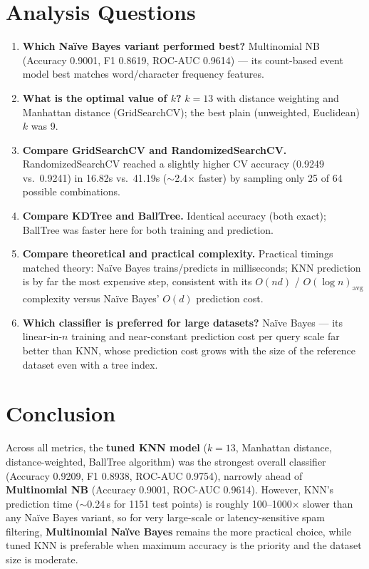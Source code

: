 \documentclass[11pt]{article}
\begin{document}
\section{Analysis Questions}
\begin{enumerate}
    \item \textbf{Which Na\"ive Bayes variant performed best?} Multinomial NB
    (Accuracy 0.9001, F1 0.8619, ROC-AUC 0.9614) — its count-based event model best
    matches word/character frequency features.
    \item \textbf{What is the optimal value of $k$?} $k=13$ with distance weighting and
    Manhattan distance (GridSearchCV); the best plain (unweighted, Euclidean) $k$ was 9.
    \item \textbf{Compare GridSearchCV and RandomizedSearchCV.} RandomizedSearchCV
    reached a slightly higher CV accuracy (0.9249 vs.\ 0.9241) in 16.82s vs.\ 41.19s
    ($\sim$2.4$\times$ faster) by sampling only 25 of 64 possible combinations.
    \item \textbf{Compare KDTree and BallTree.} Identical accuracy (both exact); BallTree
    was faster here for both training and prediction.
    \item \textbf{Compare theoretical and practical complexity.} Practical timings
    matched theory: Na\"ive Bayes trains/predicts in milliseconds; KNN prediction is by
    far the most expensive step, consistent with its $O(nd)$ / $O(\log n)_\text{avg}$
    complexity versus Na\"ive Bayes' $O(d)$ prediction cost.
    \item \textbf{Which classifier is preferred for large datasets?} Na\"ive Bayes —
    its linear-in-$n$ training and near-constant prediction cost per query scale far
    better than KNN, whose prediction cost grows with the size of the reference dataset
    even with a tree index.
\end{enumerate}

\section{Conclusion}
Across all metrics, the \textbf{tuned KNN model} ($k=13$, Manhattan distance,
distance-weighted, BallTree algorithm) was the strongest overall classifier
(Accuracy 0.9209, F1 0.8938, ROC-AUC 0.9754), narrowly ahead of \textbf{Multinomial
NB} (Accuracy 0.9001, ROC-AUC 0.9614). However, KNN's prediction time
($\sim$0.24\,s for 1151 test points) is roughly 100--1000$\times$ slower than any
Na\"ive Bayes variant, so for very large-scale or latency-sensitive spam filtering,
\textbf{Multinomial Na\"ive Bayes} remains the more practical choice, while tuned KNN
is preferable when maximum accuracy is the priority and the dataset size is moderate.
\end{document}
